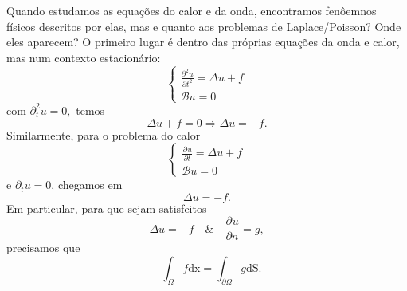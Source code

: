 \documentclass[../pde_notes.tex]{subfiles}
\begin{document}
Quando estudamos as equações do calor e da onda, encontramos fenôemnos físicos descritos por elas, mas e quanto aos problemas de Laplace/Poisson? Onde eles aparecem?
O primeiro lugar é dentro das próprias equações da onda e calor, mas num contexto estacionário:
\[
	\left\{\begin{array}{ll}
		\frac{\partial^{2}u}{\partial t^{2}} = \Delta u + f \\
		\mathcal{B}u = 0
	\end{array}\right.
\]
com \(\partial_{t}^{2}u = 0,\) temos
\[
	\Delta u + f = 0 \Rightarrow \Delta u = -f.
\]
Similarmente, para o problema do calor
\[
	\left\{\begin{array}{ll}
		\frac{\partial^{}u}{\partial t^{}} = \Delta u + f \\
		\mathcal{B}u = 0
	\end{array}\right.
\]
e \(\partial_{t}u = 0\), chegamos em
\[
	\Delta u = -f.
\]
Em particular, para que sejam satisfeitos
\[
	\Delta u = - f\quad\&\quad \frac{\partial^{}u}{\partial n^{}} = g,
\]
precisamos que
\[
	-\int_{\Omega }^{}f \mathrm{dx} = \int_{\partial \Omega }^{}g \mathrm{dS}.
\]
\end{document}
